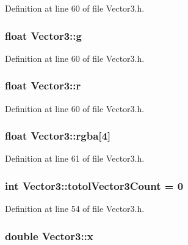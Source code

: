 Definition at line 60 of file Vector3.\-h.

\hypertarget{class_vector3_a8a37d2d94360d873e5eae2afcebddfdd}{
\subsubsection[{g}]{\setlength{\rightskip}{0pt plus 5cm}float Vector3\-::g}}\label{class_vector3_a8a37d2d94360d873e5eae2afcebddfdd}


Definition at line 60 of file Vector3.\-h.

\hypertarget{class_vector3_a83d49327a46971813ef59a9d96f99d1a}{
\subsubsection[{r}]{\setlength{\rightskip}{0pt plus 5cm}float Vector3\-::r}}\label{class_vector3_a83d49327a46971813ef59a9d96f99d1a}


Definition at line 60 of file Vector3.\-h.

\hypertarget{class_vector3_a37a489d4fcc8044f95ae8520fb0974d4}{
\subsubsection[{rgba}]{\setlength{\rightskip}{0pt plus 5cm}float Vector3\-::rgba\mbox{[}4\mbox{]}}}\label{class_vector3_a37a489d4fcc8044f95ae8520fb0974d4}


Definition at line 61 of file Vector3.\-h.

\hypertarget{class_vector3_a3142c9bdfeaa6eff51cbd02bf583603b}{
\subsubsection[{totol\-Vector3\-Count}]{\setlength{\rightskip}{0pt plus 5cm}int Vector3\-::totol\-Vector3\-Count = 0\hspace{0.3cm}{\ttfamily [static]}}}\label{class_vector3_a3142c9bdfeaa6eff51cbd02bf583603b}


Definition at line 54 of file Vector3.\-h.

\hypertarget{class_vector3_a60aa84ebc037dec9faba617f8ddb231d}{
\subsubsection[{x}]{\setlength{\rightskip}{0pt plus 5cm}double Vector3\-::x}}\label{class_vector3_a60aa84ebc037dec9faba617f8ddb231d}


